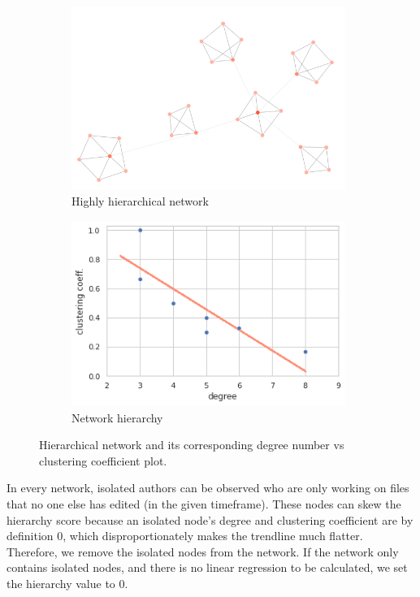 \begin{figure}[!htbp]
    \centering
    \begin{subfigure}{0.49\textwidth}
        \centering
        \includegraphics[width=0.98\textwidth]{figures/hierarchical.png}
        \caption{Highly hierarchical network}
        \label{fig:hierarchical}
    \end{subfigure}
    \hfill
    \begin{subfigure}{0.49\textwidth}
        \centering
        \includegraphics[width=0.98\textwidth]{figures/hierarchy_plot2.png}
        \caption{Network hierarchy}
        \label{fig:hierarchy plot}
    \end{subfigure}
    \caption{Hierarchical network and its corresponding degree number vs clustering coefficient plot.}
    \label{fig:hierarchy}
\end{figure}

In every network, isolated authors can be observed who are only working on files that no one else has edited (in the given timeframe). These nodes can skew the hierarchy score because an isolated node's degree and clustering coefficient are by definition 0, which disproportionately makes the trendline much flatter. Therefore, we remove the isolated nodes from the network. If the network only contains isolated nodes, and there is no linear regression to be calculated, we set the hierarchy value to 0.

